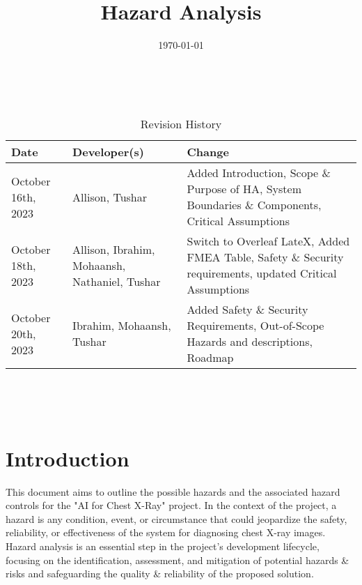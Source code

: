 \documentclass{article}
\title{Hazard Analysis\\\progname}
\author{\authname}
\date{\today}
\begin{document}
\maketitle
\thispagestyle{empty}

~\newpage


\begin{table}[hp]
\caption{Revision History} \label{TblRevisionHistory}
\begin{tabularx}{\textwidth}{p{3cm}p{4cm}X}
\toprule
\textbf{Date} & \textbf{Developer(s)} & \textbf{Change}\\
\midrule
October 16th, 2023 & Allison, Tushar & Added Introduction, Scope \& Purpose of HA, System Boundaries \& Components, Critical Assumptions\\
October 18th, 2023 & Allison, Ibrahim, Mohaansh, Nathaniel, Tushar & Switch to Overleaf LateX, Added FMEA Table, Safety \& Security requirements, updated Critical Assumptions\\
October 20th, 2023 & Ibrahim, Mohaansh, Tushar & Added Safety \& Security Requirements, Out-of-Scope Hazards and descriptions, Roadmap\\
\bottomrule
\end{tabularx}
\end{table}

~\newpage

\tableofcontents

~\newpage


\section{Introduction}
This document aims to outline the possible hazards and the associated hazard controls for the "AI for Chest X-Ray" project. In the context of the project, a hazard is any condition, event, or circumstance that could jeopardize the safety, reliability, or effectiveness of the system for diagnosing chest X-ray images. Hazard analysis is an essential step in the project's development lifecycle, focusing on the identification, assessment, and mitigation of potential hazards \& risks and safeguarding the quality \& reliability of the proposed solution.
\end{document}

